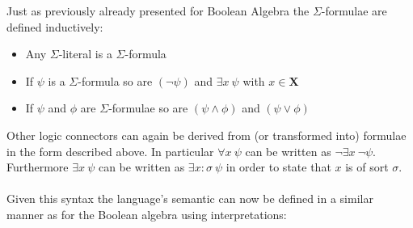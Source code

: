 \begin{definition}
Just as previously already presented for Boolean Algebra the $\Sigma$-formulae are defined inductively:
\begin{itemize}
    \item Any $\Sigma$-literal is a $\Sigma$-formula
    \item If $\psi$ is a $\Sigma$-formula so are $\left(\neg\psi\right)$ and $\exists x\ \psi$ with $x\in\mathbf{X}$
    \item If $\psi$ and $\phi$ are $\Sigma$-formulae so are $\left(\psi\land\phi\right)$ and $\left(\psi\lor\phi\right)$
\end{itemize}
\end{definition}
Other logic connectors can again be derived from (or transformed into) formulae in the form described above. In particular $\forall x\ \psi$ can be written as $\neg\exists x\ \neg\psi$.\\
Furthermore $\exists x\ \psi$ can be written as $\exists x\colon\!\sigma\ \psi$ in order to state that $x$ is of sort $\sigma$.

\paragraph{}
Given this syntax the language's semantic can now be defined in a similar manner as for the Boolean algebra using interpretations:

